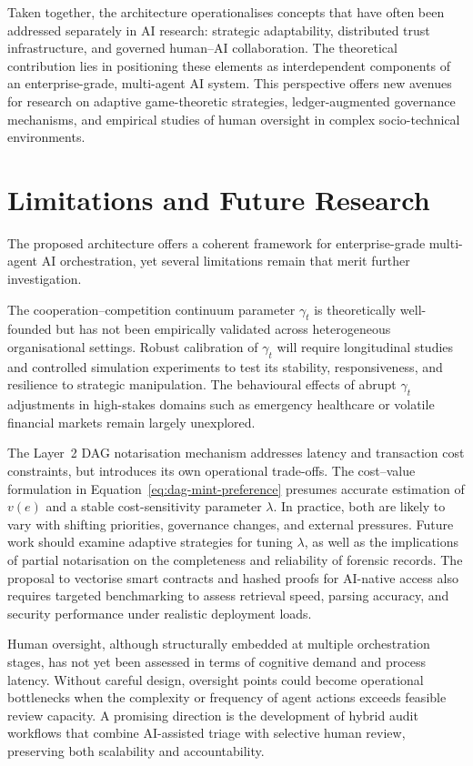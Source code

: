 \documentclass[oneside,10pt]{swissi}
\begin{document}
Taken together, the architecture operationalises concepts that have often been addressed separately in AI research: strategic adaptability, distributed trust infrastructure, and governed human–AI collaboration. The theoretical contribution lies in positioning these elements as interdependent components of an enterprise-grade, multi-agent AI system. This perspective offers new avenues for research on adaptive game-theoretic strategies, ledger-augmented governance mechanisms, and empirical studies of human oversight in complex socio-technical environments.

\section{Limitations and Future Research}\label{sec6}

The proposed architecture offers a coherent framework for enterprise-grade multi-agent AI orchestration, yet several limitations remain that merit further investigation.

The cooperation--competition continuum parameter $\gamma_t$ is theoretically well-founded but has not been empirically validated across heterogeneous organisational settings. Robust calibration of $\gamma_t$ will require longitudinal studies and controlled simulation experiments to test its stability, responsiveness, and resilience to strategic manipulation. The behavioural effects of abrupt $\gamma_t$ adjustments in high-stakes domains such as emergency healthcare or volatile financial markets remain largely unexplored.

The Layer~2 DAG notarisation mechanism addresses latency and transaction cost constraints, but introduces its own operational trade-offs. The cost–value formulation in Equation~\eqref{eq:dag-mint-preference} presumes accurate estimation of $v(e)$ and a stable cost-sensitivity parameter $\lambda$. In practice, both are likely to vary with shifting priorities, governance changes, and external pressures. Future work should examine adaptive strategies for tuning $\lambda$, as well as the implications of partial notarisation on the completeness and reliability of forensic records. The proposal to vectorise smart contracts and hashed proofs for AI-native access also requires targeted benchmarking to assess retrieval speed, parsing accuracy, and security performance under realistic deployment loads.

Human oversight, although structurally embedded at multiple orchestration stages, has not yet been assessed in terms of cognitive demand and process latency. Without careful design, oversight points could become operational bottlenecks when the complexity or frequency of agent actions exceeds feasible review capacity. A promising direction is the development of hybrid audit workflows that combine AI-assisted triage with selective human review, preserving both scalability and accountability.
\end{document}
